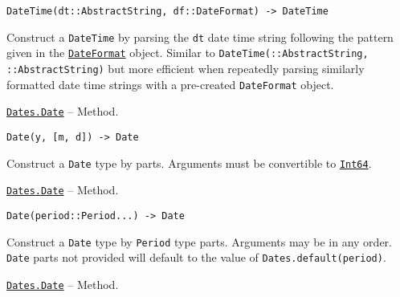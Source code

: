 \begin{adjustwidth}{2em}{0pt}


\begin{verbatim}
DateTime(dt::AbstractString, df::DateFormat) -> DateTime
\end{verbatim}

Construct a \texttt{DateTime} by parsing the \texttt{dt} date time string following the pattern given in the \hyperlink{18093459443158853001}{\texttt{DateFormat}} object. Similar to \texttt{DateTime(::AbstractString, ::AbstractString)} but more efficient when repeatedly parsing similarly formatted date time strings with a pre-created \texttt{DateFormat} object.



\end{adjustwidth}
\hypertarget{3763584541689775694}{} 
\hyperlink{3763584541689775694}{\texttt{Dates.Date}}  -- {Method.}

\begin{adjustwidth}{2em}{0pt}


\begin{verbatim}
Date(y, [m, d]) -> Date
\end{verbatim}

Construct a \texttt{Date} type by parts. Arguments must be convertible to \hyperlink{7720564657383125058}{\texttt{Int64}}.



\end{adjustwidth}
\hypertarget{13807007941640052204}{} 
\hyperlink{13807007941640052204}{\texttt{Dates.Date}}  -- {Method.}

\begin{adjustwidth}{2em}{0pt}


\begin{verbatim}
Date(period::Period...) -> Date
\end{verbatim}

Construct a \texttt{Date} type by \texttt{Period} type parts. Arguments may be in any order. \texttt{Date} parts not provided will default to the value of \texttt{Dates.default(period)}.



\end{adjustwidth}
\hypertarget{14780297511642453784}{} 
\hyperlink{14780297511642453784}{\texttt{Dates.Date}}  -- {Method.}

